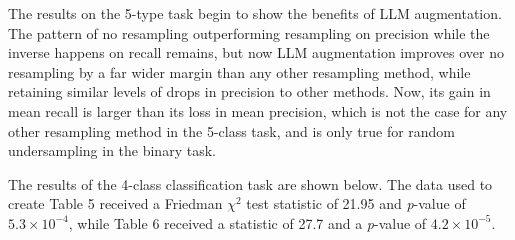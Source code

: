 \documentclass[runningheads]{llncs}
\begin{document}
The results on the 5-type task begin to show the benefits of LLM augmentation. The pattern of no resampling outperforming resampling on precision while the inverse happens on recall remains, but now LLM augmentation improves over no resampling by a far wider margin than any other resampling method, while retaining similar levels of drops in precision to other methods. Now, its gain in mean recall is larger than its loss in mean precision, which is not the case for any other resampling method in the 5-class task, and is only true for random undersampling in the binary task.

The results of the 4-class classification task are shown below. The data used to create Table 5 received a Friedman $\chi^2$ test statistic of 21.95 and \emph{p}-value of $5.3 \times 10^{-4}$, while Table 6 received a statistic of 27.7 and a \emph{p}-value of $4.2 \times 10^{-5}$.
\end{document}
